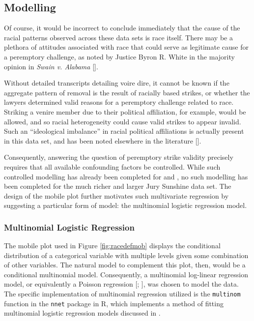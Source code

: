 \subsection{Modelling} \label{sec:mods}

Of course, it would be incorrect to conclude immediately that the cause of the racial patterns observed across these data sets is
race itself. There may be a plethora of attitudes associated with race that could serve as legitimate cause for a peremptory
challenge, as noted by Justice Byron R. White in the majority opinion in \textit{Swain v. Alabama} [\cite{swainvalabama}].

Without detailed transcripts detailing voire dire, it cannot be known if the aggregate pattern of removal is the result of racially based strikes, or whether the lawyers
determined valid reasons for a peremptory challenge related to race. Striking a venire member due to their political affiliation, for example, would be allowed, and so racial heterogeneity could cause valid strikes to appear invalid. Such an ``ideological imbalance'' in racial political affiliations is actually present in this data set, and has been noted elsewhere in the literature [\cite{revesz2016}].

Consequently, answering the question of peremptory strike validity precisely requires that all available confounding factors be controlled. While such controlled modelling has already been completed for \cite{StubbornLegacy} and \cite{PerempChalMurder}, no such modelling has been completed for the much richer and larger Jury Sunshine data set. The design of the mobile plot further motivates such multivariate regression by suggesting a particular form of model: the multinomial logistic regression model.

\subsubsection{Multinomial Logistic Regression}

The mobile plot used in Figure \ref{fig:racedefmob} displays the
conditional distribution of a categorical variable with multiple levels given some combination of other variables. The natural model to complement this plot, then, would be a conditional multinomial model. Consequently, a multinomial log-linear regression model, or equivalently a Poisson regression [\cite{baker1994}; \cite{lang1996}], was chosen to model the data. The specific implementation of multinomial regression utilized is the
\texttt{multinom} function in the \texttt{nnet} package in R, which implements a method of fitting multinomial logistic regression models discussed
in \cite{nnet}.

